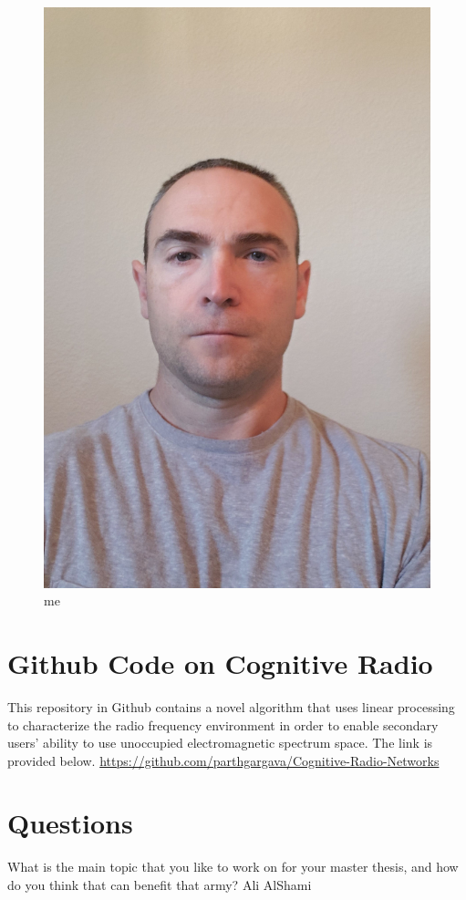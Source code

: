 \documentclass{article}
\begin{document}
\begin{figure}
    \centering
    \includegraphics[scale=.25]{self pic2.jpg}
    \caption{me}
    \label{fig:me}
\end{figure}
\newpage
\section{Github Code on Cognitive Radio}
This repository in Github contains a novel algorithm that uses linear processing to characterize the radio frequency environment in order to enable secondary users' ability to use unoccupied electromagnetic spectrum space.  The link is provided below.
\url{https://github.com/parthgargava/Cognitive-Radio-Networks}

\section{Questions}
What is the main topic that you like to work on for your master thesis, and how do you think that can benefit that army? Ali AlShami
\end{document}

